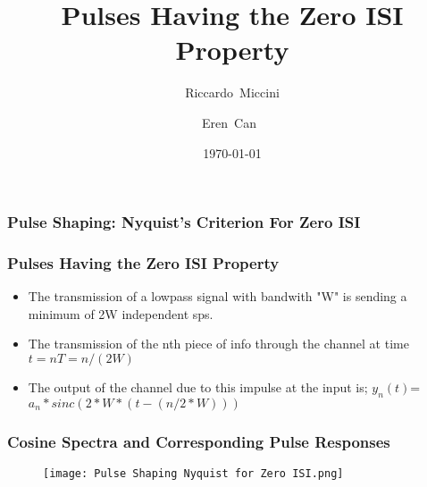 \documentclass{beamer}
\title{Pulses Having the Zero ISI Property}
\subtitle{}
\author[Riccardo \and Eren]{Riccardo~Miccini\inst{1} \and Eren~Can~\inst{1}}
\institute[DTU]
{
	\inst{1}
	Technical University of Denmark\\
	Digital Communication
}
\date{\today}
\begin{document}
	\frame{\titlepage}
	\begin{frame}
		\frametitle{Pulse Shaping: Nyquist's Criterion For Zero ISI}
	\end{frame}
	\begin{frame}
		\frametitle{Pulses Having the Zero ISI Property}
		\begin{itemize}
			\item The transmission of a lowpass signal with bandwith "W" is sending a minimum of 2W independent sps.
			\item The transmission of the nth piece of info through the channel at time $t= nT=n/(2W)$
			\item The output of the channel due to this impulse at the input is; $y_n(t)$=$ a_n *sinc(2*W*(t-(n/2*W)))$
			\end{itemize}
			\end{frame}
			\begin{frame}
			\frametitle{Cosine Spectra and Corresponding Pulse Responses}
			\begin{figure}
			\texttt{[image: Pulse Shaping Nyquist for Zero ISI.png]}
			\end{figure}
			\end{frame}
			
\end{document}
